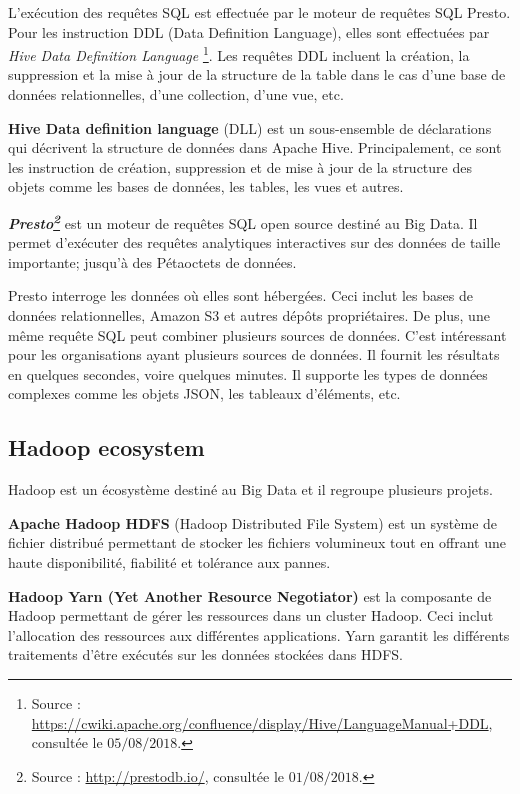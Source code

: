 L'exécution des requêtes SQL est effectuée par le moteur de requêtes SQL Presto. Pour les instruction DDL (Data Definition Language), elles sont effectuées par  \textit{Hive Data Definition Language} \footnote{Source : \url{https://cwiki.apache.org/confluence/display/Hive/LanguageManual+DDL}, consultée le $05/08/2018$.}. Les requêtes DDL incluent la création, la suppression et la mise à jour de la structure de la table dans le cas d'une base de données relationnelles, d'une collection, d'une vue, etc. 

\begin{tcolorbox}
	\textbf{Hive Data definition language} (DLL) est un sous-ensemble de déclarations qui décrivent la structure de données dans Apache Hive.  Principalement, ce sont les instruction de création, suppression et de mise à jour de la structure des objets comme les bases de données, les tables, les vues et autres.
\end{tcolorbox}

\begin{tcolorbox}
	\textbf{\textit{Presto\footnote{Source : \url{http://prestodb.io/}, consultée le $01/08/2018$.} }} est un moteur de requêtes SQL open source destiné au Big Data. Il permet d'exécuter des requêtes analytiques interactives sur des données de taille importante; jusqu'à des Pétaoctets de données.
	
	Presto interroge les données où elles sont hébergées. Ceci inclut les bases de données relationnelles, Amazon S3 et autres dépôts propriétaires. De plus, une même requête SQL peut combiner plusieurs sources de données. C'est intéressant pour les organisations ayant plusieurs sources de données. Il fournit les résultats en quelques secondes, voire quelques minutes.  Il supporte les types de données complexes comme les objets JSON, les tableaux d'éléments, etc. 
\end{tcolorbox} 


\subsection{Hadoop ecosystem}

Hadoop est un écosystème destiné au Big Data et il regroupe plusieurs projets. \par 
\textbf{Apache Hadoop HDFS}  (Hadoop Distributed File System) est un système de fichier distribué permettant de stocker les fichiers volumineux tout en  offrant une haute disponibilité, fiabilité et tolérance aux pannes.\par
\textbf{Hadoop Yarn (Yet Another Resource Negotiator)} est la composante  de Hadoop permettant de  gérer les ressources dans un cluster Hadoop. Ceci inclut l'allocation des ressources aux différentes applications.  Yarn  garantit les différents traitements d'être exécutés sur les données stockées dans HDFS.\par

